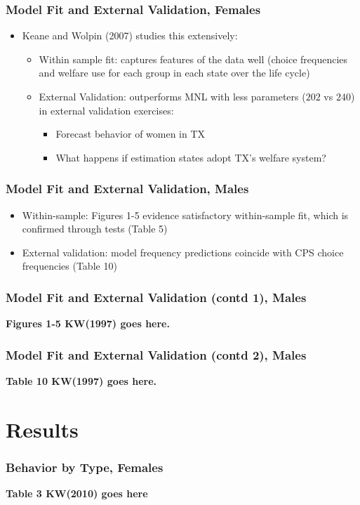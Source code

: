 \begin{frame}
	\frametitle{Model Fit and External Validation, Females}
		\begin{itemize}
			\item Keane and Wolpin (2007) studies this  extensively:
				\begin{itemize}
					\item Within sample fit: captures features of the data well (choice frequencies and welfare use for each group in each state over the life cycle)
					\item External Validation: outperforms MNL with less parameters ($202$ vs $240$) in external validation exercises: 
					\begin{itemize}
						\item Forecast behavior of women in TX
						\item What happens if estimation states adopt TX's welfare system?
					\end{itemize}
				\end{itemize}
		\end{itemize}				
\end{frame}

\begin{frame}
	\frametitle{Model Fit and External Validation, Males}
		\begin{itemize}
			\item Within-sample: Figures 1-5 evidence satisfactory within-sample fit, which is confirmed through tests (Table 5)
			\item External validation: model frequency predictions coincide with CPS choice frequencies (Table 10)
		\end{itemize}
\end{frame}

\begin{frame}
	\frametitle{Model Fit and External Validation (contd 1), Males}
	\textbf{Figures 1-5 KW(1997) goes here.}
\end{frame}

\begin{frame}
	\frametitle{Model Fit and External Validation (contd 2), Males}
	\textbf{Table 10 KW(1997) goes here.}
\end{frame}

\section{Results}
\begin{frame}
	\frametitle{Behavior by Type, Females}
	\textbf{Table 3 KW(2010) goes here}	
\end{frame}

